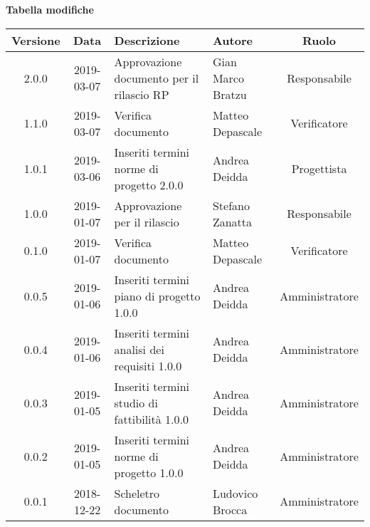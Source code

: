 \begin{center}
	\textbf{Tabella modifiche}
	\end{center}
	\begin{center}
		\begin{tabularx}{\textwidth}{|c|c|X|X|c|}
			\hline
			\textbf{Versione} & \textbf{Data} & \textbf{Descrizione} & \textbf{Autore} & \textbf{Ruolo} \\
			\hline
			2.0.0 & 2019-03-07 & Approvazione documento per il rilascio RP & Gian Marco Bratzu & Responsabile \\
			\hline
			1.1.0 & 2019-03-07 & Verifica documento & Matteo Depascale & Verificatore \\
			\hline
			1.0.1 & 2019-03-06 & Inseriti termini norme di progetto 2.0.0 & Andrea Deidda & Progettista \\
			\hline
			1.0.0 & 2019-01-07 & Approvazione per il rilascio & Stefano Zanatta & Responsabile \\
			\hline
			0.1.0 & 2019-01-07 & Verifica documento & Matteo Depascale & Verificatore \\
			\hline
			0.0.5 & 2019-01-06 & Inseriti termini piano di progetto 1.0.0 & Andrea Deidda & Amministratore\\
			\hline
			0.0.4 & 2019-01-06 & Inseriti termini analisi dei requisiti 1.0.0 & Andrea Deidda & Amministratore\\
			\hline
			0.0.3 & 2019-01-05 & Inseriti termini studio di fattibilità 1.0.0 & Andrea Deidda & Amministratore\\
			\hline
			0.0.2 & 2019-01-05 & Inseriti termini norme di progetto 1.0.0 & Andrea Deidda & Amministratore\\
			\hline
			0.0.1 & 2018-12-22 & Scheletro documento & Ludovico Brocca & Amministratore\\
			\hline
		\end{tabularx}
	\end{center}
\newpage